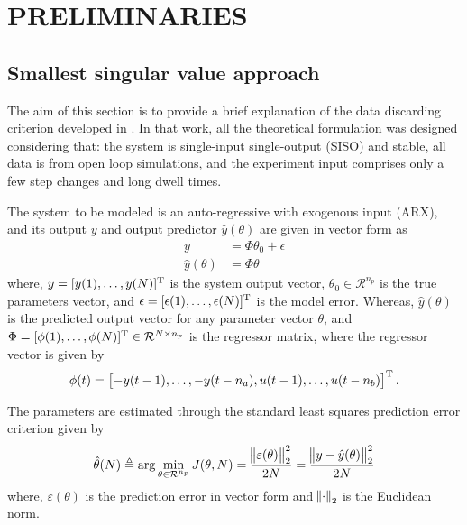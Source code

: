 

\section{\label{sec:preliminaries} PRELIMINARIES}

\subsection{Smallest singular value approach}

The aim of this section is to provide a brief explanation of the data discarding criterion developed in \cite{carrette1996discarding}.
In that work, all the theoretical formulation was designed considering that: the system is single-input single-output (SISO) and stable, all data is from open loop simulations, and the experiment input comprises only a few step changes and long dwell times.

The system to be modeled is an auto-regressive with exogenous input (ARX), and its output $y$ and output predictor $\hat{y}(\theta)$ are given in vector form as
\begin{align}
	y &= \Phi\theta_0 + \epsilon \label{eq:system_vec}\\
	\hat{y}(\theta) &= \Phi\theta \label{eq:predic_output_vec}
\end{align}
where, $y = [y(1), \dots, y(N)]^\text{T}$ is the system output vector,  $\theta_0 \in \mathcal{R}^{n_p}$ is the true parameters vector, and $\epsilon = [\epsilon(1), \dots, \epsilon(N)]^\text{T}$ is the model error. %
Whereas, $\hat{y}(\theta)$ is the predicted output vector for any parameter vector $\theta$, and $\Phi = [\phi(1), \dots, \phi(N)]^\text{T} \in \mathcal{R}^{N \times n_p}$ is the regressor matrix, where the regressor vector is given by
\begin{align*}
	\phi(t) = \left[ -y(t-1), \dots, -y(t-n_a), u(t-1), \dots, u(t-n_b) \right] ^\text{T}.
\end{align*}

The parameters are estimated through the standard least squares prediction error criterion given by
\[
	\hat{\theta}(N) \triangleq \arg \min_{\theta \in \mathcal{R}^{n_p}} J(\theta, N) = \frac{\norm{\varepsilon(\theta)}_2^2}{2N} = \frac{\norm{y-\hat{y}(\theta)}_2^2}{2N}
\]
where, $\varepsilon(\theta)$ is the prediction error in vector form and $\norm{\cdot}_2$ is the Euclidean norm.

